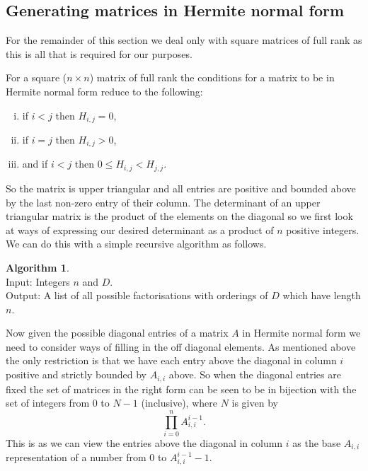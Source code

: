 \documentclass[12pt,a4paper,abstracton,bibtotoc]{scrreprt}
\theoremstyle{definition}
\newtheorem{alg}{Algorithm}
\begin{document}
\subsection{Generating matrices in Hermite normal form}
For the remainder of this section we deal only with square matrices of full rank as this is all that is required for our purposes.

For a square ($n\times n$) matrix of full rank the conditions for a matrix to be in Hermite normal form reduce to the following:
\begin{enumerate}[i)]
\item if $i < j$ then $H_{i,j} = 0$,
\item if $i = j$ then $H_{i,j} > 0$,
\item and if $i < j$ then $0\le H_{i,j} < H_{j,j}$.
\end{enumerate}
So the matrix is upper triangular and all entries are positive and bounded above by the last non-zero entry of their column.
The determinant of an upper triangular matrix is the product of the elements on the diagonal so we first look at ways of expressing our desired determinant as a product of $n$ positive integers.
We can do this with a simple recursive algorithm as follows.

\begin{alg}~\\
Input: Integers $n$ and $D$.\\
Output: A list of all possible factorisations with orderings of $D$ which have length $n$.\\
\begin{algorithm}[H]
\end{algorithm}
\end{alg}

Now given the possible diagonal entries of a matrix $A$ in Hermite normal form we need to consider ways of filling in the off diagonal elements.
As mentioned above the only restriction is that we have each entry above the diagonal in column $i$ positive and strictly bounded by $A_{i,i}$ above.
So when the diagonal entries are fixed the set of matrices in the right form can be seen to be in bijection with the set of integers from 0 to $N - 1$ (inclusive), where $N$ is given by
\[
\prod_{i = 0}^n A_{i,i}^{i-1}.
\]
This is as we can view the entries above the diagonal in column $i$ as the base $A_{i,i}$ representation of a number from 0 to $A_{i,i}^{i-1} - 1$.
\end{document}
